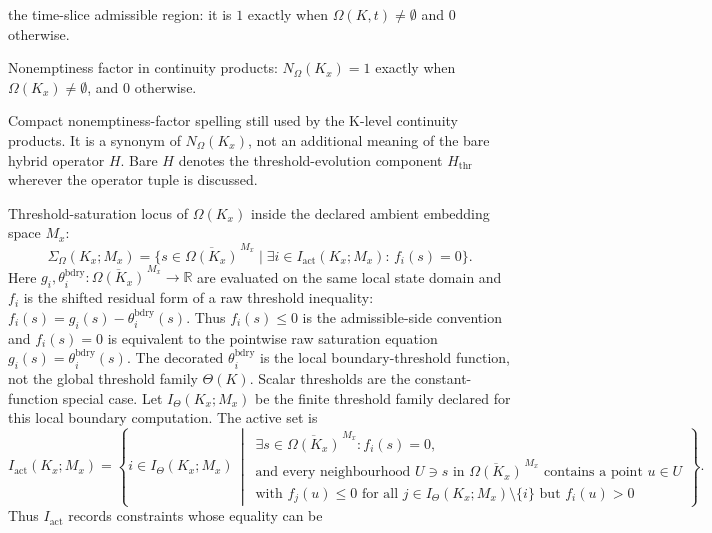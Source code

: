 \begin{description}
        the time-slice admissible region: it is \(1\) exactly when
        \(\Omega(K,t)\neq\emptyset\) and \(0\) otherwise.
  \item[\(N_{\Omega}(K_x)\)] Nonemptiness factor in continuity products:
        \(N_{\Omega}(K_x)=1\) exactly when \(\Omega(K_x)\neq\emptyset\), and
        \(0\) otherwise.
  \item[\(H(\Omega(K_x))\)] Compact nonemptiness-factor spelling still used by
        the K-level continuity products. It is a synonym of
        \(N_{\Omega}(K_x)\), not an additional meaning of the bare hybrid
        operator \(H\). Bare \(H\) denotes the threshold-evolution component
        \(H_{\mathrm{thr}}\) wherever the operator tuple is discussed.
  \item[\(\Sigma_{\Omega}(K_x;M_x)\)] Threshold-saturation locus of
        \(\Omega(K_x)\) inside the declared ambient embedding space \(M_x\):
        \[
          \Sigma_{\Omega}(K_x;M_x)=
          \{s\in\overline{\Omega(K_x)}^{\,M_x}\mid
          \exists i\in I_{\mathrm{act}}(K_x;M_x):\,f_i(s)=0\}.
        \]
        Here \(g_i,\theta_i^{\mathrm{bdry}}:
        \overline{\Omega(K_x)}^{\,M_x}\to\mathbb{R}\) are evaluated on the same
        local state domain and \(f_i\) is the shifted residual form of a raw
        threshold inequality:
        \(f_i(s)=g_i(s)-\theta_i^{\mathrm{bdry}}(s)\). Thus \(f_i(s)\le0\) is
        the admissible-side convention and \(f_i(s)=0\) is equivalent to the
        pointwise raw saturation equation \(g_i(s)=
        \theta_i^{\mathrm{bdry}}(s)\). The decorated
        \(\theta_i^{\mathrm{bdry}}\) is the local boundary-threshold function,
        not the global threshold family \(\Theta(K)\). Scalar thresholds are
        the constant-function special case. Let
        \(I_{\Theta}(K_x;M_x)\) be the finite threshold family declared for this
        local boundary computation. The active set is
        \[
          I_{\mathrm{act}}(K_x;M_x)=
          \left\{i\in I_{\Theta}(K_x;M_x)\,\middle|\,
          \begin{array}{l}
          \exists s\in\overline{\Omega(K_x)}^{\,M_x}: f_i(s)=0,\\
          \text{and every neighbourhood }U\ni s\text{ in }
          \overline{\Omega(K_x)}^{\,M_x}\text{ contains a point }u\in U\\
          \text{with } f_j(u)\le0\text{ for all }j\in I_{\Theta}(K_x;M_x)\setminus\{i\}\text{ but }f_i(u)>0
          \end{array}\right\}.
        \]
        Thus \(I_{\mathrm{act}}\) records constraints whose equality can be

\end{description}
